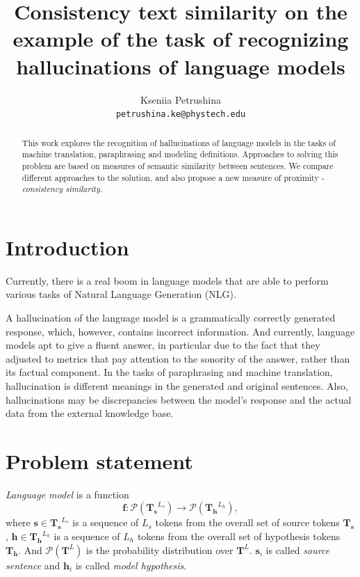 \documentclass[11pt]{article}
\title{Consistency text similarity on the example of the task of recognizing hallucinations of language models}
\author{Kseniia Petrushina \\
  \texttt{petrushina.ke@phystech.edu}}
\begin{document}
\maketitle
\begin{abstract}

This work explores the recognition of hallucinations of language models in the tasks of machine translation, paraphrasing and modeling definitions. Approaches to solving this problem are based on measures of semantic similarity between sentences. We compare different approaches to the solution, and also propose a new measure of proximity - \textit{consistency similarity}.

\end{abstract}

\section{Introduction}

Currently, there is a real boom in language models that are able to perform various tasks of Natural Language Generation (NLG).

A hallucination of the language model is a grammatically correctly generated response, which, however, contains incorrect information. And currently, language models apt to give a fluent answer, in particular due to the fact that they adjusted to metrics that pay attention to the sonority of the answer, rather than its factual component. In the tasks of paraphrasing and machine translation, hallucination is different meanings in the generated and original sentences. Also, hallucinations may be discrepancies between the model's response and the actual data from the external knowledge base.

\section{Problem statement}

\textit{Language model} is a function 
\[\mathbf{f}: \mathcal{P}(\mathbf{T_s}^{L_s})\to \mathcal{P}(\mathbf{T_h}^{L_h}),\]
where $\mathbf{s} \in \mathbf{T_s}^{L_s}$ is a sequence of $L_s$ tokens from the overall set of source tokens $\mathbf{T_s}$, $\mathbf{h} \in \mathbf{T_h}^{L_h}$ is a sequence of $L_h$ tokens from the overall set of hypothesis tokens $\mathbf{T_h}$. And $\mathcal{P}(\mathbf{T}^{L})$ is the probability distribution over $\mathbf{T}^{L}$. $\mathbf{s}_i$ is called \textit{source sentence} and $\mathbf{h}_i$ is called \textit{model hypothesis}.
\end{document}
